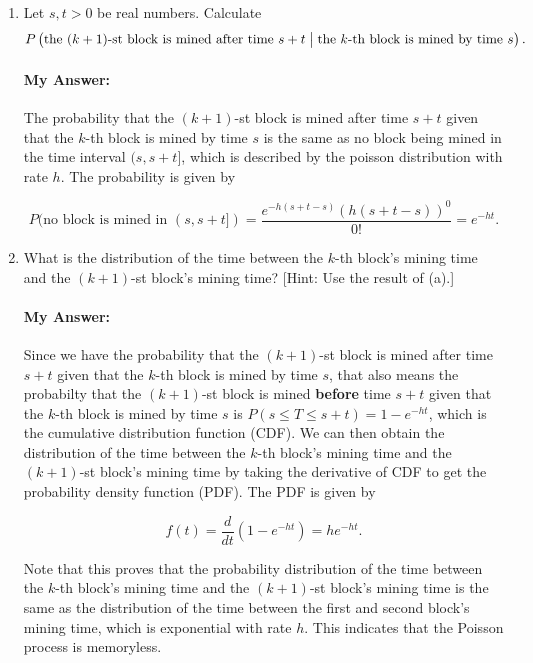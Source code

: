 \documentclass{article}
\begin{document}
\begin{enumerate}[label=(\alph*)]
    \item Let $s,t>0$ be real numbers. Calculate
          \[ P\left(\text{the } (k+1)\text{-st block is mined after time } s+t \bigm| \text{the } k\text{-th block is mined by time } s\right). \]
    \paragraph{My Answer:} The probability that the \((k+1)\)-st block is mined after time \( s+t \) given that the \( k \)-th block is mined by time \( s \) is the same as no block being mined in the time interval \((s,s+t]\), which is described by the poisson distribution with rate \( h \).  The probability is given by

    \begin{equation} 
        P(\text{no block is mined in } (s,s+t]) = \frac {e^{-h(s+t-s)} (h(s+t-s))^0} {0!} = e^{-ht}.
    \end{equation}\label{eq:prob_no_block}

    \item What is the distribution of the time between the \(k\)-th block's mining time and the \((k+1)\)-st block's mining time? [Hint: Use the result of (a).]
    \paragraph{My Answer:} Since we have the probability that the \((k+1)\)-st block is mined after time \( s+t \) given that the \( k \)-th block is mined by time \( s \), that also means the probabilty that the \((k+1)\)-st block is mined \textbf{before} time \( s+t \) given that the \( k \)-th block is mined by time \( s \) is \( P(s \leq T \leq s+t) = 1 - e^{-ht} \), which is the cumulative distribution function (CDF).  We can then obtain the distribution of the time between the \( k \)-th block's mining time and the \((k+1)\)-st block's mining time by taking the derivative of CDF to get the probability density function (PDF).  The PDF is given by

    \begin{equation}
        f(t) = \frac{d}{dt} (1 - e^{-ht}) = h e^{-ht}.
    \end{equation}

    Note that this proves that the probability distribution of the time between the \( k \)-th block's mining time and the \((k+1)\)-st block's mining time is the same as the distribution of the time between the first and second block's mining time, which is exponential with rate \( h \). This indicates that the Poisson process is memoryless.

\end{enumerate}
\end{document}
